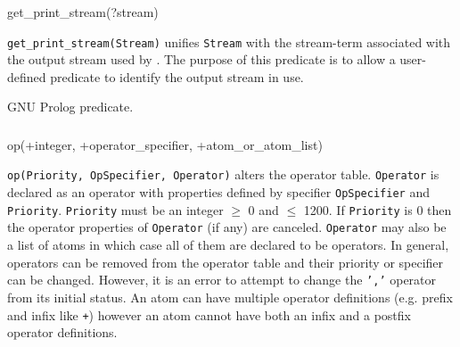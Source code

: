 \subsubsection{}

\begin{TemplatesOneCol}
get\_print\_stream(?stream)

\end{TemplatesOneCol}

\Description

\texttt{get\_print\_stream(Stream)} unifies \texttt{Stream} with the
stream-term associated with the output stream used by 
. The purpose of this predicate is to allow a
user-defined  predicate to identify the output stream in
use.

\begin{PlErrors}


\end{PlErrors}

\Portability

GNU Prolog predicate.

\subsubsection{\label{op/3:(Term-input/output)}}

\begin{TemplatesOneCol}
op(+integer, +operator\_specifier, +atom\_or\_atom\_list)

\end{TemplatesOneCol}

\Description

\texttt{op(Priority, OpSpecifier, Operator)} alters the operator table.
\texttt{Operator} is declared as an operator with properties defined by
specifier \texttt{OpSpecifier} and \texttt{Priority}. \texttt{Priority} must
be an integer $\geq$ 0 and $\leq$ 1200. If \texttt{Priority} is 0 then the
operator properties of \texttt{Operator} (if any) are canceled.
\texttt{Operator} may also be a list of atoms in which case all of them are
declared to be operators. In general, operators can be removed from
the operator table and their priority or specifier can be changed. However,
it is an error to attempt to change the \texttt{','} operator from its
initial status. An atom can have multiple operator definitions (e.g.
prefix and infix like \texttt{+}) however an atom cannot have both an
infix and a postfix operator definitions.

